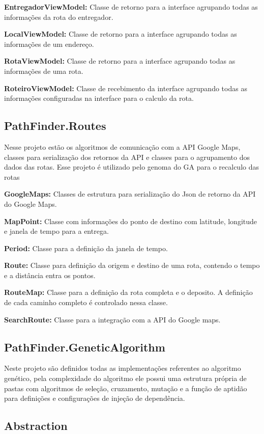 \textbf{EntregadorViewModel:} Classe de retorno para a interface agrupando todas as informações da rota do entregador.

\textbf{LocalViewModel:} Classe de retorno para a interface agrupando todas as informações de um endereço.

\textbf{RotaViewModel:} Classe de retorno para a interface agrupando todas as informações de uma rota.

\textbf{RoteiroViewModel:} Classe de recebimento da interface agrupando todas as informações configuradas na interface para o calculo da rota.

\subsection{PathFinder.Routes}
Nesse projeto estão os algoritmos de comunicação com a  API Google Maps, classes para serialização dos retornos da API e classes para o agrupamento dos dados das rotas. Esse projeto é utilizado pelo genoma do GA para o recalculo das rotas

\textbf{GoogleMaps:} Classes de estrutura para serialização do Json de retorno da API do Google Maps.

\textbf{MapPoint:} Classe com informações do ponto de destino com latitude, longitude e janela de tempo para a entrega.

\textbf{Period:} Classe para a definição da janela de tempo.

\textbf{Route:} Classe para definição da origem e destino de uma rota, contendo o tempo e a distância entra os pontos.

\textbf{RouteMap:} Classe para a definição da rota completa e o deposito. A definição de cada caminho completo é controlado nessa classe. 

\textbf{SearchRoute:} Classe para a integração com a API do Google maps.

\subsection{PathFinder.GeneticAlgorithm}
Neste projeto são definidos todas as implementações referentes ao algoritmo genético, pela complexidade do algoritmo ele possui uma estrutura própria de pastas com algoritmos de seleção, cruzamento, mutação e a função de aptidão para definições e configurações de injeção de dependência.

\subsection{Abstraction}

